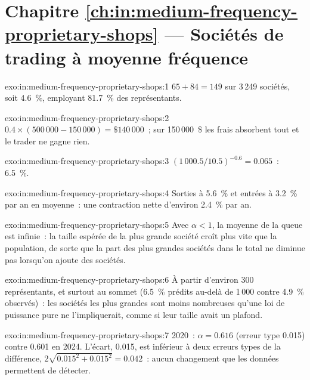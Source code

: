 \section*{Chapitre \ref{ch:in:medium-frequency-proprietary-shops} --- Sociétés de trading à moyenne fréquence}

\begin{solution}{exo:in:medium-frequency-proprietary-shops:1}
$65+84=149$ sur 3\,249 sociétés, soit 4.6~\%, employant 81.7~\% des représentants.
\end{solution}

\begin{solution}{exo:in:medium-frequency-proprietary-shops:2}
$0.4\times(500\,000-150\,000)=\$140\,000$~; sur 150\,000~\$ les frais absorbent tout et le trader ne gagne rien.
\end{solution}

\begin{solution}{exo:in:medium-frequency-proprietary-shops:3}
$(1\,000.5/10.5)^{-0.6}=0.065$~: 6.5~\%.
\end{solution}

\begin{solution}{exo:in:medium-frequency-proprietary-shops:4}
Sorties à 5.6~\% et entrées à 3.2~\% par an en moyenne~: une contraction nette d'environ 2.4~\% par an.
\end{solution}

\begin{solution}{exo:in:medium-frequency-proprietary-shops:5}
Avec $\alpha<1$, la moyenne de la queue est infinie~: la taille espérée de la plus grande société croît plus vite que la population,
de sorte que la part des plus grandes sociétés dans le total ne diminue pas lorsqu'on ajoute des sociétés.
\end{solution}

\begin{solution}{exo:in:medium-frequency-proprietary-shops:6}
À partir d'environ 300 représentants, et surtout au sommet (6.5~\% prédits au-delà de 1\,000 contre 4.9~\% observés)~: les
sociétés les plus grandes sont moins nombreuses qu'une loi de puissance pure ne l'impliquerait, comme si leur taille avait un plafond.
\end{solution}

\begin{solution}{exo:in:medium-frequency-proprietary-shops:7}
2020~: $\alpha=0.616$ (erreur type 0.015) contre 0.601 en 2024. L'écart, 0.015, est inférieur à deux erreurs types de la
différence, $2\sqrt{0.015^2+0.015^2}=0.042$~: aucun changement que les données permettent de détecter.
\end{solution}

